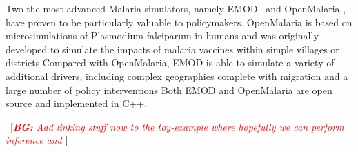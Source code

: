 \documentclass{article}
\newcommand{\bg}[1]{~{{[{\it \textcolor{red}{{\bf BG:} #1}}]}}}
\begin{document}
Two the most advanced Malaria simulators, namely EMOD~\cite{bershteyn2018implementation} and OpenMalaria  \cite{smith2008towards}, have proven to be particularly valuable to policymakers.
OpenMalaria is based on microsimulations of Plasmodium falciparum in humans and was originally developed to simulate the impacts of malaria vaccines within simple villages or districts
Compared with OpenMalaria, EMOD is able to simulate a variety of additional drivers, including complex geographies complete with migration and a large number of policy interventions
Both EMOD and OpenMalaria are open source and implemented in C++.

\bg{Add linking stuff now to the toy-example where hopefully we can perform inference and }






%


\end{document}
